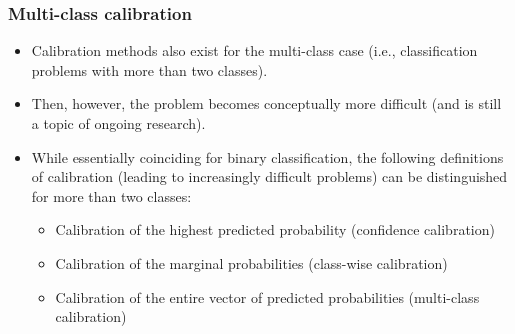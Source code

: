 \begin{frame}[t]
	\frametitle{Multi-class calibration}
	
	\begin{itemize}
		\item Calibration methods also exist for the multi-class case (i.e., classification problems with more than two classes).
		\item Then, however, the problem becomes conceptually more difficult (and is still a topic of ongoing research).
		\item 
		While essentially coinciding for binary classification, the following definitions of calibration (leading to increasingly difficult problems) can be distinguished for more than two classes:
		\begin{itemize}
			\item Calibration of the highest predicted probability (confidence calibration) 
			\item Calibration of the marginal probabilities (class-wise calibration)
			\item Calibration of the entire vector of predicted probabilities (multi-class calibration)
		\end{itemize}
	\end{itemize}
\end{frame}

%
\endlecture


